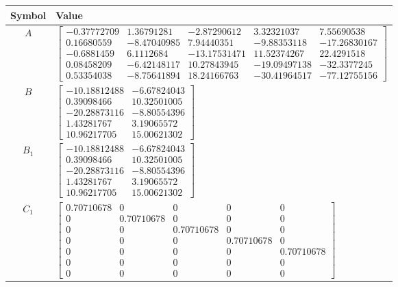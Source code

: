 \begin{tabular}{cl}
\hline
  Symbol  & Value                                                                                                                                                                                                                                                                                                                                                                                      \\
\hline
   $A$    & $\left[\begin{matrix}-0.37772709 & 1.36791281 & -2.87290612 & 3.32321037 & 7.55690538\\0.16680559 & -8.47040985 & 7.94440351 & -9.88353118 & -17.26830167\\-0.6881459 & 6.1112684 & -13.17531471 & 11.52374267 & 22.4291518\\0.08458209 & -6.42148117 & 10.27843945 & -19.09497138 & -32.3377245\\0.53354038 & -8.75641894 & 18.24166763 & -30.41964517 & -77.12755156\end{matrix}\right]$ \\
   $B$    & $\left[\begin{matrix}-10.18812488 & -6.67824043\\0.39098466 & 10.32501005\\-20.28873116 & -8.80554396\\1.43281767 & 3.19065572\\10.96217705 & 15.00621302\end{matrix}\right]$                                                                                                                                                                                                              \\
 $B_{1}$  & $\left[\begin{matrix}-10.18812488 & -6.67824043\\0.39098466 & 10.32501005\\-20.28873116 & -8.80554396\\1.43281767 & 3.19065572\\10.96217705 & 15.00621302\end{matrix}\right]$                                                                                                                                                                                                              \\
 $C_{1}$  & $\left[\begin{matrix}0.70710678 & 0 & 0 & 0 & 0\\0 & 0.70710678 & 0 & 0 & 0\\0 & 0 & 0.70710678 & 0 & 0\\0 & 0 & 0 & 0.70710678 & 0\\0 & 0 & 0 & 0 & 0.70710678\\0 & 0 & 0 & 0 & 0\\0 & 0 & 0 & 0 & 0\end{matrix}\right]$                                                                                                                                                                  \\

\end{tabular}
